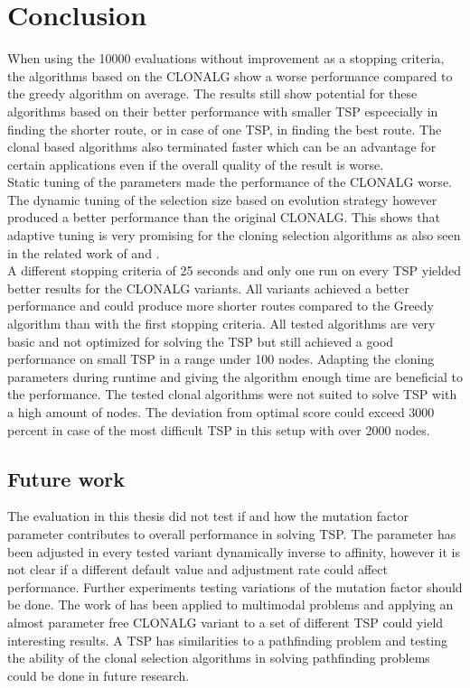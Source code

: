 \chapter{Conclusion}
\label{chap:con}
When using the 10000 evaluations without improvement as a stopping criteria, the algorithms based on the CLONALG show a worse performance compared to the greedy algorithm on average. The results still show potential for these algorithms based on their better performance with smaller TSP espcecially in finding the shorter route, or in case of one TSP, in finding the best route. The clonal based algorithms also terminated faster which can be an advantage for certain applications even if the overall quality of the result is worse.\\
Static tuning of the parameters made the performance of the CLONALG worse. The dynamic tuning of the selection size based on evolution strategy however produced a better performance than the original CLONALG. This shows that adaptive tuning is very promising for the cloning selection algorithms as also seen in the related work of \cite{Garret04} and \Cite{RIFF09}.\\
A different stopping criteria of 25 seconds and only one run on every TSP yielded better results for the CLONALG variants. All variants achieved a better performance and could produce more shorter routes compared to the Greedy algorithm than with the first stopping criteria. All tested algorithms are very basic and not optimized for solving the TSP but still achieved a good performance on small TSP in a range under 100 nodes. Adapting the cloning parameters during runtime and giving the algorithm enough time are beneficial to the performance. The tested clonal algorithms were not suited to solve TSP with a high amount of nodes. The deviation from optimal score could exceed 3000 percent in case of the most difficult TSP in this setup with over 2000 nodes.
\newpage 
\section{Future work}
The evaluation in this thesis did not test if and how the mutation factor parameter contributes to overall performance in solving TSP. The parameter has been adjusted in every tested variant dynamically inverse to affinity, however it is not clear if a different default value and adjustment rate could affect performance. Further experiments testing variations of the mutation factor should be done. The work of \cite{Garret04} has been applied to multimodal problems and applying an almost parameter free CLONALG variant to a set of different TSP could yield interesting results. A TSP has similarities to a pathfinding problem and testing the ability of the clonal selection algorithms in solving pathfinding problems could be done in future research.